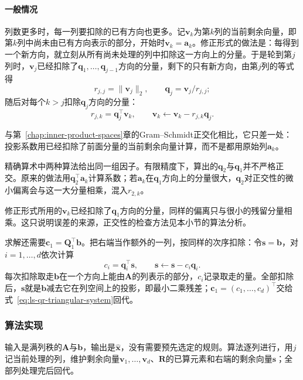 \paragraph{一般情况}
列数更多时，每一列要扣除的已有方向也更多。记$\bm v_k$为第$k$列的当前剩余向量，即第$k$列中尚未由已有方向表示的部分，开始时$\bm v_k=\bm a_k$。修正形式的做法是：每得到一个新方向，就立刻从所有尚未处理的列中扣除这一方向上的分量。于是轮到第$j$列时，$\bm v_j$已经扣除了$\bm q_1,\ldots,\bm q_{j-1}$方向的分量，剩下的只有新方向，由第$j$列的等式得
\begin{equation}
 r_{j,j}=\lVert\bm v_j\rVert_2,\qquad \bm q_j=\bm v_j/r_{j,j};
 \label{eq:ls-mgs-normalize}
\end{equation}
随后对每个$k>j$扣除$\bm q_j$方向的分量：
\begin{equation}
 r_{j,k}=\bm q_j^\top\bm v_k,\qquad \bm v_k\leftarrow\bm v_k-r_{j,k}\bm q_j .
 \label{eq:ls-mgs-update}
\end{equation}

与第~\ref{chap:inner-product-spaces}章的Gram--Schmidt正交化相比，它只差一处：投影系数用已经扣除了前面分量的当前剩余向量计算，而不是都用原始列$\bm a_k$。

精确算术中两种算法给出同一组因子。有限精度下，算出的$\bm q_2$与$\bm q_1$并不严格正交。原来的做法用$\bm q_2^\top\bm a_k$计算系数；若$\bm a_k$在$\bm q_1$方向上的分量很大，$\bm q_2$对正交性的微小偏离会与这一大分量相乘，混入$r_{2,k}$。

修正形式所用的$\bm v_k$已经扣除了$\bm q_1$方向的分量，同样的偏离只与很小的残留分量相乘。这只说明误差的来源，正交性的检查方法见本小节的算法分析。

求解还需要$\bm c_1=\bm Q_1^\top\bm b$。把右端当作额外的一列，按同样的次序扣除：令$\bm s=\bm b$，对$i=1,\ldots,d$依次计算
\begin{equation}
 c_i=\bm q_i^\top\bm s,\qquad \bm s\leftarrow\bm s-c_i\bm q_i .
 \label{eq:ls-mgs-rhs}
\end{equation}
每次扣除取走$\bm b$在一个方向上能由$\bm A$的列表示的部分，$c_i$记录取走的量。全部扣除后，$\bm s$就是$\bm b$减去它在列空间上的投影，即最小二乘残差；$\bm c_1=(c_1,\ldots,c_d)^\top$交给式~\eqref{eq:ls-qr-triangular-system}回代。

\subsubsection{算法实现}
输入是满列秩的$\bm A$与$\bm b$，输出是$\hat{\bm x}$，没有需要预先选定的规则。算法逐列进行，用$j$记当前处理的列，维护剩余向量$\bm v_1,\ldots,\bm v_d$、$\bm R$的已算元素和右端的剩余向量$\bm s$；全部列处理完后回代。


